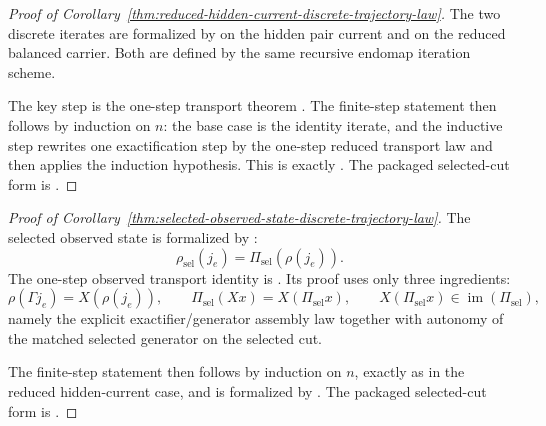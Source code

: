 \begin{proof}[Proof of Corollary~\ref{thm:reduced-hidden-current-discrete-trajectory-law}]
\label{proof:thm:reduced-hidden-current-discrete-trajectory-law}
The two discrete iterates are formalized by
 on the hidden pair
current and  on the
reduced balanced carrier. Both are defined by the same recursive endomap
iteration scheme.

The key step is the one-step transport theorem
. The finite-step
statement then follows by induction on \(n\): the base case is the identity
iterate, and the inductive step rewrites one exactification step by the
one-step reduced transport law and then applies the induction hypothesis.
This is exactly
. The packaged
selected-cut form is
.
\end{proof}

\begin{proof}[Proof of Corollary~\ref{thm:selected-observed-state-discrete-trajectory-law}]
\label{proof:thm:selected-observed-state-discrete-trajectory-law}
The selected observed state is formalized by
:
\[
\rho_{\mathrm{sel}}(j_e)
=
\Pi_{\mathrm{sel}}(\rho(j_e)).
\]
The one-step observed transport identity is
. Its proof uses
only three ingredients:
\[
\rho(\Gamma j_e)=X(\rho(j_e)),
\qquad
\Pi_{\mathrm{sel}}(Xx)=X(\Pi_{\mathrm{sel}}x),
\qquad
X(\Pi_{\mathrm{sel}}x)\in\operatorname{im}(\Pi_{\mathrm{sel}}),
\]
namely the explicit exactifier/generator assembly law together with autonomy of
the matched selected generator on the selected cut.

The finite-step statement then follows by induction on \(n\), exactly as in the
reduced hidden-current case, and is formalized by
. The packaged
selected-cut form is
.
\end{proof}


